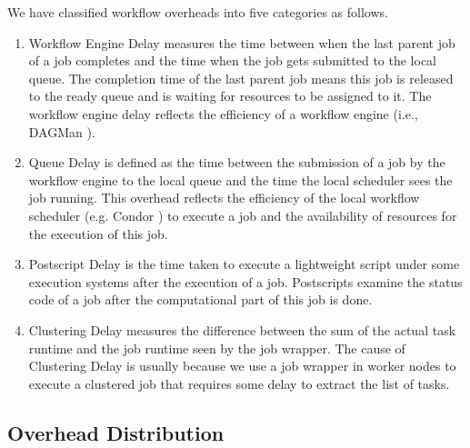 We have classified workflow overheads into five categories as follows. 
\begin{enumerate}

\item{Workflow Engine Delay} measures the time between when the last parent job of a job completes and the time when the job gets submitted to the local queue. 
The completion time of the last parent job means this job is released to the ready queue and is waiting for resources to be assigned to it. The workflow engine delay reflects the efficiency of a workflow engine (i.e., DAGMan \cite{DAGMan}). 

\item{Queue Delay} is defined as the time between the submission of a job by the workflow engine to the local queue and the time the local scheduler sees the job running. This overhead reflects the efficiency of the local workflow scheduler (e.g. Condor \cite{Frey2002}) to execute a job and the availability of resources for the execution of this job. 

\item{Postscript Delay } is the time taken to execute a lightweight script under some execution systems after the execution of a job. Postscripts examine the status code of a job after the computational part of this job is done.


\item{Clustering Delay} measures the difference between the sum of the actual task runtime and the job runtime seen by the job wrapper. The cause of Clustering Delay is usually because we use a job wrapper in worker nodes to execute a clustered job that requires some delay to extract the list of tasks. 
\end{enumerate}

\subsection{Overhead Distribution}

